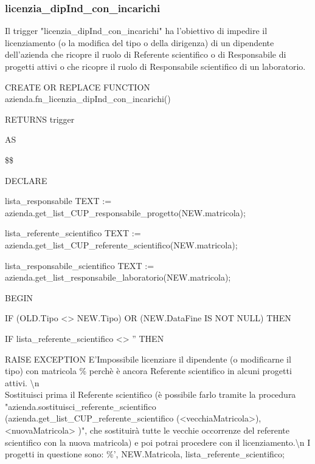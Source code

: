         \subsubsection{licenzia\_dipInd\_con\_incarichi}
        Il trigger "licenzia\_dipInd\_con\_incarichi" ha l'obiettivo di impedire il licenziamento (o la modifica del tipo o della dirigenza) di un dipendente dell'azienda che ricopre il ruolo di Referente scientifico o di Responsabile di progetti attivi o che ricopre il ruolo di Responsabile scientifico di un laboratorio.
        \ttfamily
            \begin{flushleft}
                \begin{description}
                    \item CREATE OR REPLACE FUNCTION azienda.fn\_licenzia\_dipInd\_con\_incarichi()  
                    \item RETURNS trigger
                    \item AS
                    \item \$\$
                    \item DECLARE
                    \begin{description}
                        \item lista\_responsabile TEXT := azienda.get\_list\_CUP\_responsabile\_progetto(NEW.matricola);
                        \item lista\_referente\_scientifico TEXT := azienda.get\_list\_CUP\_referente\_scientifico(NEW.matricola);
                        \item lista\_responsabile\_scientifico TEXT := azienda.get\_list\_responsabile\_laboratorio(NEW.matricola);
                    \end{description}
                    \item BEGIN 
                    \begin{description}
                        \item IF (OLD.Tipo <> NEW.Tipo) OR (NEW.DataFine IS NOT NULL) THEN
                        \begin{description}
                            \item IF lista\_referente\_scientifico <> '' THEN
                            \begin{description}
                                \item RAISE EXCEPTION E'Impossibile licenziare il dipendente (o modificarne il tipo) con matricola \% perchè è ancora Referente scientifico in alcuni progetti attivi. \textbackslash{n} \\Sostituisci prima il Referente scientifico (è possibile farlo tramite la procedura "azienda.sostituisci\_referente\_scientifico (azienda.get\_list\_CUP\_referente\_scientifico (<vecchiaMatricola>), <nuovaMatricola> )", che sostituirà tutte le vecchie occorrenze del referente scientifico con la nuova matricola) e poi potrai procedere con il licenziamento.\textbackslash{n} I progetti in questione sono: \%', NEW.Matricola, lista\_referente\_scientifico;

\end{description}
\end{description}
\end{description}
\end{description}
\end{flushleft}
